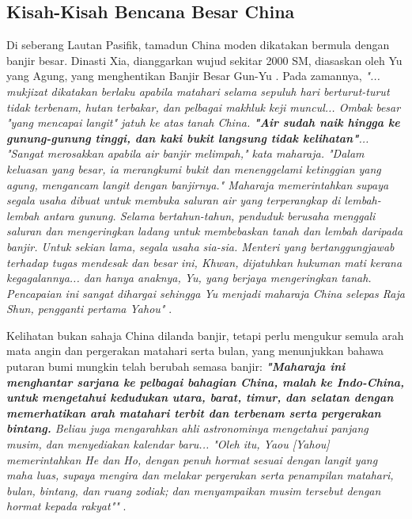 \documentclass[10pt,twocolumn,letterpaper]{article}
\begin{document}
\subsection{Kisah-Kisah Bencana Besar China}

Di seberang Lautan Pasifik, tamadun China moden dikatakan bermula dengan banjir besar. Dinasti Xia, dianggarkan wujud sekitar 2000 SM, diasaskan oleh Yu yang Agung, yang menghentikan Banjir Besar Gun-Yu \cite{6}. Pada zamannya, \textit{"... mukjizat dikatakan berlaku apabila matahari selama sepuluh hari berturut-turut tidak terbenam, hutan terbakar, dan pelbagai makhluk keji muncul... Ombak besar "yang mencapai langit" jatuh ke atas tanah China. \textbf{"Air sudah naik hingga ke gunung-gunung tinggi, dan kaki bukit langsung tidak kelihatan"}... "Sangat merosakkan apabila air banjir melimpah," kata maharaja. "Dalam keluasan yang besar, ia merangkumi bukit dan menenggelami ketinggian yang agung, mengancam langit dengan banjirnya." Maharaja memerintahkan supaya segala usaha dibuat untuk membuka saluran air yang terperangkap di lembah-lembah antara gunung. Selama bertahun-tahun, penduduk berusaha menggali saluran dan mengeringkan ladang untuk membebaskan tanah dan lembah daripada banjir. Untuk sekian lama, segala usaha sia-sia. Menteri yang bertanggungjawab terhadap tugas mendesak dan besar ini, Khwan, dijatuhkan hukuman mati kerana kegagalannya... dan hanya anaknya, Yu, yang berjaya mengeringkan tanah. Pencapaian ini sangat dihargai sehingga Yu menjadi maharaja China selepas Raja Shun, pengganti pertama Yahou"} \cite{5}.

Kelihatan bukan sahaja China dilanda banjir, tetapi perlu mengukur semula arah mata angin dan pergerakan matahari serta bulan, yang menunjukkan bahawa putaran bumi mungkin telah berubah semasa banjir: \textit{\textbf{"Maharaja ini menghantar sarjana ke pelbagai bahagian China, malah ke Indo-China, untuk mengetahui kedudukan utara, barat, timur, dan selatan dengan memerhatikan arah matahari terbit dan terbenam serta pergerakan bintang.} Beliau juga mengarahkan ahli astronominya mengetahui panjang musim, dan menyediakan kalendar baru... "Oleh itu, Yaou [Yahou] memerintahkan He dan Ho, dengan penuh hormat sesuai dengan langit yang maha luas, supaya mengira dan melakar pergerakan serta penampilan matahari, bulan, bintang, dan ruang zodiak; dan menyampaikan musim tersebut dengan hormat kepada rakyat""} \cite{5}.
\end{document}
